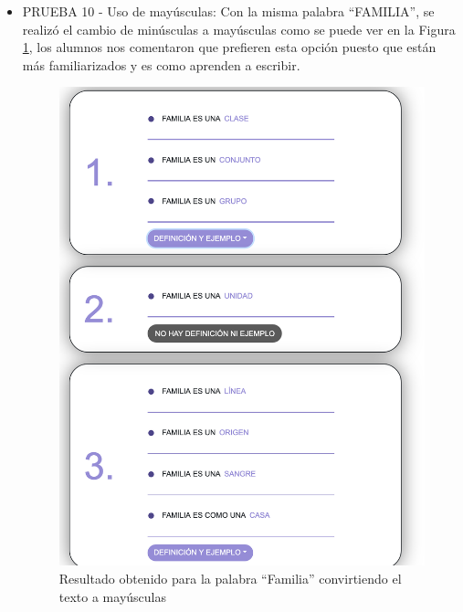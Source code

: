 \begin{itemize}
\item PRUEBA 10 - Uso de mayúsculas:  Con la misma palabra ``FAMILIA'', se realizó el cambio de minúsculas a mayúsculas como se puede ver en la Figura \ref{fig:familiaMayusculas}, los alumnos nos comentaron que prefieren esta opción puesto que están más familiarizados y es como aprenden a escribir.

\begin{figure}[!h]
	\includegraphics[width=.7\textwidth]{Imagenes/Bitmap/Capitulo4/EvaluacionFinal/10familiamayusculas.png}
	\centering
	\caption{Resultado obtenido para la palabra ``Familia'' convirtiendo el texto a mayúsculas}
	\label{fig:familiaMayusculas}
\end{figure}

\end{itemize}



